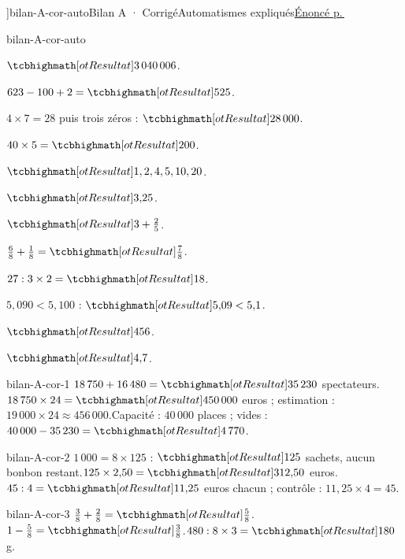 \editionPage[\pdfbookmark[0]{Corrigés des bilans}{bm-bilan-A-cor-auto-parent}]{bilan-A-cor-auto}{Bilan A · Corrigé}{Automatismes expliqués}{\hyperref[bilan-A-auto]{Énoncé p.\,\pageref*{bilan-A-auto}}}
\begin{blocEdition}{bilan-A-cor-auto}
\begin{questions}
\item $\res{3\,040\,006}$.
\item $623-100+2=\res{525}$.
\item $4\times7=28$ puis trois zéros : $\res{28\,000}$.
\item $40\times5=\res{200}$.
\item $\res{1, 2, 4, 5, 10, 20}$.
\item $\res{3{,}25}$.
\item $\res{3+\frac25}$.
\item $\frac68+\frac18=\res{\frac78}$.
\item $27:3\times2=\res{18}$.
\item $5{,}090<5{,}100$ : $\res{5{,}09<5{,}1}$.
\item $\res{456}$.
\item $\res{4{,}7}$.\end{questions}
\end{blocEdition}
\begin{blocEdition}{bilan-A-cor-1}
$18\,750+16\,480=\res{35\,230}$ spectateurs.$18\,750\times24=\res{450\,000}$ euros ; estimation : $19\,000\times24\approx456\,000$.Capacité : $40\,000$ places ; vides : $40\,000-35\,230=\res{4\,770}$.
\end{blocEdition}
\begin{blocEdition}{bilan-A-cor-2}
$1\,000=8\times125$ : $\res{125}$ sachets, aucun bonbon restant.$125\times2{,}50=\res{312{,}50}$ euros.$45:4=\res{11{,}25}$ euros chacun ; contrôle : $11{,}25\times4=45$.
\end{blocEdition}
\begin{blocEdition}{bilan-A-cor-3}
$\frac38+\frac28=\res{\frac58}$.$1-\frac58=\res{\frac38}$.$480:8\times3=\res{180}$ g.
\end{blocEdition}
